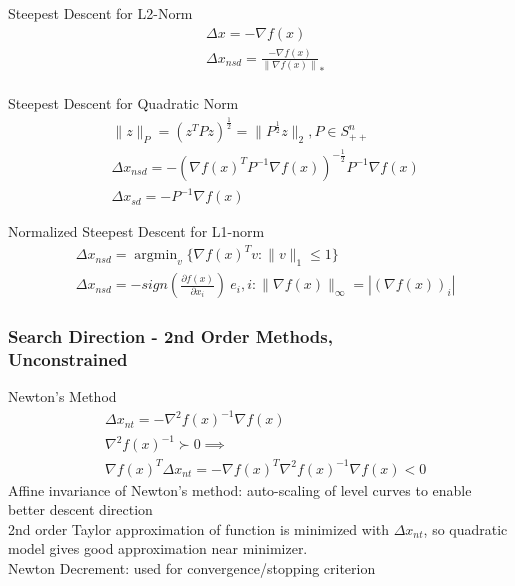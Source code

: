 \documentclass[8pt]{report}
\DeclareMathOperator*{\argmin}{argmin}
\newcommand{\norm}[1]{\|#1\|}
\newcommand{\set}[1]{\{#1\}}
\begin{document}
\begin{multicols*}{2}
  Steepest Descent for L2-Norm
  \begin{align*}
    &\Delta x = -\nabla f(x)\\
    &\Delta x_{nsd} = \frac{-\nabla f(x)}{\norm{\nabla f(x)}}_*\\
  \end{align*}
  
  Steepest Descent for Quadratic Norm
  \begin{align*}
    &\norm{z}_P = (z^TPz)^{\frac{1}{2}} = \norm{P^{\frac{1}{2}}z}_2, P \in S_{++}^n\\
    &\Delta x_{nsd} = -(\nabla f(x)^T P^{-1} \nabla f(x))^{-\frac{1}{2}} P^{-1} \nabla f(x)\\
    &\Delta x_{sd} = -P^{-1} \nabla f(x)
  \end{align*}

  Normalized Steepest Descent for L1-norm
  \begin{align*}
    &\Delta x_{nsd} = \argmin_{v} \set{ \nabla f(x)^T v : \norm{v}_1 \leq 1 }\\
    &\Delta x_{nsd} = - sign (\frac{\partial f(x)}{\partial x_i})\ e_i, i: \norm{\nabla f(x)}_{\infty} = |(\nabla f(x))_i|
  \end{align*}
  \vfill\null  
  \pagebreak
  
  \subsubsection{Search Direction - 2nd Order Methods,\\ Unconstrained}
  Newton's Method
  \begin{align*}
    &\Delta x_{nt} = - \nabla^2 f(x)^{-1} \nabla f(x)\\
    &\nabla^2 f(x)^{-1} \succ 0 \implies\\
    &\nabla f(x)^T \Delta x_{nt} = - \nabla f(x)^T \nabla^2 f(x)^{-1} \nabla f(x) < 0
  \end{align*}
  Affine invariance of Newton's method: auto-scaling of level curves to enable better descent direction\\
  
  2nd order Taylor approximation of function is minimized with $\Delta x_{nt}$, so quadratic model gives good approximation near minimizer.\\

  Newton Decrement: used for convergence/stopping criterion
  

\end{multicols*}
\end{document}
